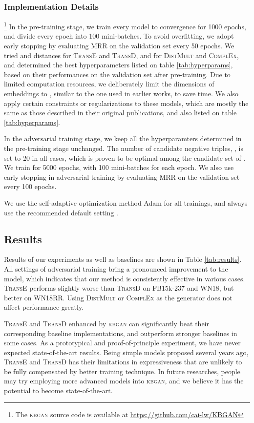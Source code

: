\documentclass[11pt,a4paper]{article}
\begin{document}
\subsubsection{Implementation Details}\footnote{The \textsc{kbgan} source code is available at \url{https://github.com/cai-lw/KBGAN}}
In the pre-training stage, we train every model to convergence for 1000 epochs, and divide every epoch into 100 mini-batches. To avoid overfitting, we adopt early stopping by evaluating MRR on the validation set every 50 epochs. We tried  and  distances for \textsc{TransE} and \textsc{TransD}, and  for \textsc{DistMult} and \textsc{ComplEx}, and determined the best hyperparameters listed on table \ref{tab:hyperparams}, based on their performances on the validation set after pre-training. Due to limited computation resources, we deliberately limit the dimensions of embeddings to , similar to the one used in earlier works, to save time. We also apply certain constraints or regularizations to these models, which are mostly the same as those described in their original publications, and also listed on table \ref{tab:hyperparams}.

In the adversarial training stage, we keep all the hyperparamters determined in the pre-training stage unchanged. The number of candidate negative triples, , is set to 20 in all cases, which is proven to be optimal among the candidate set of . We train for 5000 epochs, with 100 mini-batches for each epoch. We also use early stopping in adversarial training by evaluating MRR on the validation set every 100 epochs.

We use the self-adaptive optimization method Adam \cite{adam} for all trainings, and always use the recommended default setting .

\subsection{Results}
Results of our experiments as well as baselines are shown in Table \ref{tab:results}. All settings of adversarial training bring a pronounced improvement to the model, which indicates that our method is consistently effective in various cases. \textsc{TransE} performs slightly worse than \textsc{TransD} on FB15k-237 and WN18, but better on WN18RR. Using \textsc{DistMult} or \textsc{ComplEx} as the generator does not affect performance greatly.

\textsc{TransE} and \textsc{TransD} enhanced by \textsc{kbgan} can significantly beat their corresponding baseline implementations, and outperform stronger baselines in some cases. As a prototypical and proof-of-principle experiment, we have never expected state-of-the-art results. Being simple models proposed several years ago, \textsc{TransE} and \textsc{TransD} has their limitations in expressiveness that are unlikely to be fully compensated by better training technique. In future researches, people may try employing more advanced models into \textsc{kbgan},  and we believe it has the potential to become state-of-the-art.
\end{document}
